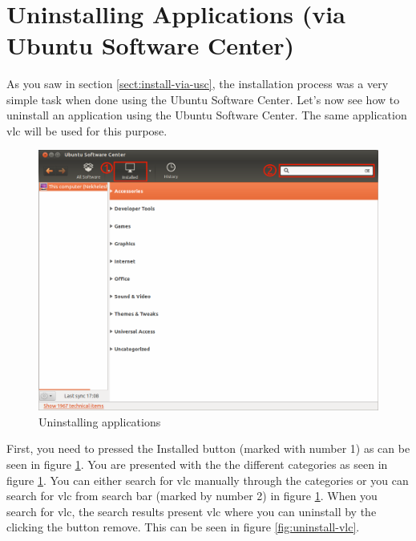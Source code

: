\par \noindent {} \\

\section{Uninstalling Applications (via Ubuntu Software Center)}
As you saw in section \ref{sect:install-via-usc}, the installation process was a very simple task when done using the Ubuntu Software Center. Let's now see how to uninstall an application using the Ubuntu Software Center. The same application vlc will be used for this purpose. 

\begin{figure}[h!]	
	\centering
	\includegraphics[width=325pt]{./images/applications/uninstall-apps.png}
	\caption{Uninstalling applications}	
	\label{fig:uninstall-apps}		
\end{figure}

\par \noindent First, you need to pressed the Installed button (marked with number 1) as can be seen in figure \ref{fig:uninstall-apps}. You are presented with the the different categories as seen in figure \ref{fig:uninstall-apps}. You can either search for vlc manually through the categories or you can search for vlc from search bar (marked by number 2) in figure \ref{fig:uninstall-apps}. When you search for vlc, the search results present vlc where you can uninstall by the clicking the button remove. This can be seen in figure \ref{fig:uninstall-vlc}.

